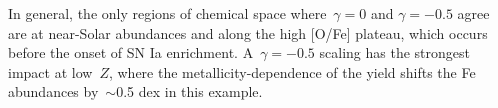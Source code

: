\documentclass[foo.tex]{subfiles}
\begin{document}
In general, the only regions of chemical space where~$\gamma = 0$ and
$\gamma = -0.5$ agree are at near-Solar abundances and along the high [O/Fe]
plateau, which occurs before the onset of SN Ia enrichment.
A~$\gamma = -0.5$ scaling has the strongest impact at low~$Z$, where the
metallicity-dependence of the yield shifts the Fe abundances by~$\sim$0.5 dex
in this example.
\end{document}
